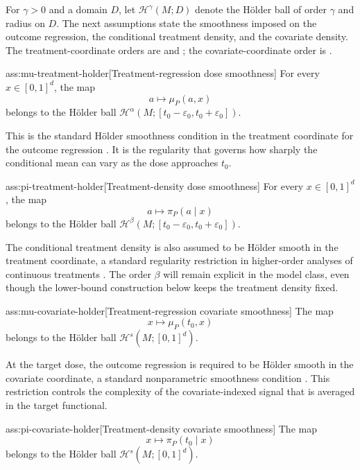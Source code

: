 For \(\gamma>0\) and a domain \(D\), let \(\mathcal H^\gamma(M;D)\) denote the Hölder ball of order \(\gamma\) and radius  on \(D\). The next assumptions state the smoothness imposed on the outcome regression, the conditional treatment density, and the covariate density. The treatment-coordinate orders are  and ; the covariate-coordinate order is .

\begin{assumptionv}{ass:mu-treatment-holder}[Treatment-regression dose smoothness]
For every \(x\in[0,1]^d\), the map
\[
a\longmapsto \mu_P(a,x)
\]
belongs to the Hölder ball \(\mathcal H^\alpha(M;[t_0-\varepsilon_0,t_0+\varepsilon_0])\).
\end{assumptionv}

This is the standard Hölder smoothness condition in the treatment coordinate for the outcome regression \citep{tsybakov2009}. It is the regularity that governs how sharply the conditional mean can vary as the dose approaches \(t_0\).

\begin{assumptionv}{ass:pi-treatment-holder}[Treatment-density dose smoothness]
For every \(x\in[0,1]^d\), the map
\[
a\longmapsto \pi_P(a\mid x)
\]
belongs to the Hölder ball \(\mathcal H^\beta(M;[t_0-\varepsilon_0,t_0+\varepsilon_0])\).
\end{assumptionv}

The conditional treatment density is also assumed to be Hölder smooth in the treatment coordinate, a standard regularity restriction in higher-order analyses of continuous treatments \citep{bonvini2022}. The order \(\beta\) will remain explicit in the model class, even though the lower-bound construction below keeps the treatment density fixed.

\begin{assumptionv}{ass:mu-covariate-holder}[Treatment-regression covariate smoothness]
The map
\[
x\longmapsto \mu_P(t_0,x)
\]
belongs to the Hölder ball \(\mathcal H^s(M;[0,1]^d)\).
\end{assumptionv}

At the target dose, the outcome regression is required to be Hölder smooth in the covariate coordinate, a standard nonparametric smoothness condition \citep{tsybakov2009}. This restriction controls the complexity of the covariate-indexed signal that is averaged in the target functional.

\begin{assumptionv}{ass:pi-covariate-holder}[Treatment-density covariate smoothness]
The map
\[
x\longmapsto \pi_P(t_0\mid x)
\]
belongs to the Hölder ball \(\mathcal H^s(M;[0,1]^d)\).
\end{assumptionv}

